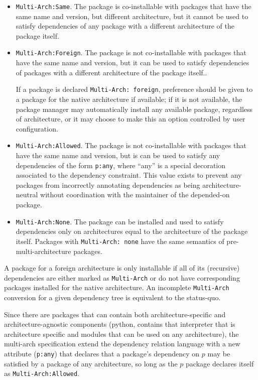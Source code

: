 \begin{itemize}
  \item{\texttt{Multi-Arch:Same}.} The package is co-installable with packages
    that have the same name and version, but different architecture,
    but it cannot be used to satisfy dependencies of any package
    with a different architecture of the package itself.

  \item{\texttt{Multi-Arch:Foreign}.} 
    The package is not co-installable with packages
    that have the same name and version, but it can be used to satisfy 
    dependencies of packages with a different architecture of the
    package itself..

    If a package is declared \texttt{Multi-Arch: foreign}, preference
    should be given to a package for the native architecture if
    available; if it is not available, the package manager may
    automatically install any available package, regardless of
    architecture, or it may choose to make this an option controlled
    by user configuration. 

  \item{\texttt{Multi-Arch:Allowed}.}
    The package is not co-installable with packages that have the same
    name and version, but is can be used to satisfy any dependencies
    of the form \texttt{p:any}, where ``any'' is a special decoration
    associated to the dependency constraint. This value exists to
    prevent any packages from incorrectly annotating dependencies as
    being architecture-neutral without coordination with the
    maintainer of the depended-on package. 

  \item{\texttt{Multi-Arch:None}.}
    The package can be installed and used to satisfy dependencies only
    on architectures equal to the architecture of the package itself.
    Packages with \texttt{Multi-Arch: none} have the same semantics of
    pre-multi-architecture packages.
\end{itemize}

A package for a foreign architecture is only installable if all of its
(recursive) dependencies are either marked as \texttt{Multi-Arch} or
do not have corresponding packages installed for the native
architecture. An incomplete \texttt{Multi-Arch} conversion for a given
dependency tree is equivalent to the status-quo. 

Since there are packages that can contain both architecture-specific
and architecture-agnostic components (python, contains that
interpreter that is architecture specific and modules that can be used
on any architecture), the multi-arch specification extend the
dependency relation language with a new attribute (\texttt{p:any})
that declares that a package's dependency on $p$ may be satisfied by a
package of any architecture, so long as the $p$ package declares
itself as \texttt{Multi-Arch:Allowed}. 

